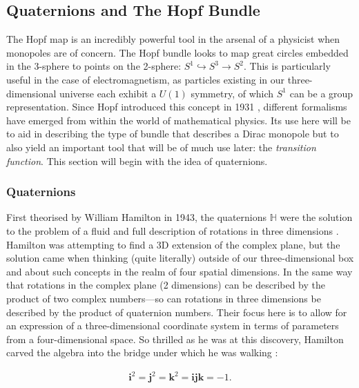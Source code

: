 \documentclass[fleqn, twocolumn, 10pt]{article}
\begin{document}

\subsection{Quaternions and The Hopf Bundle}

The Hopf map is an incredibly powerful tool in the arsenal of a physicist when monopoles are of concern. The Hopf bundle looks to map great circles embedded in the 3-sphere to points on the 2-sphere: $S^1 \hookrightarrow S^3 \to S^2$. This is particularly useful in the case of electromagnetism, as particles existing in our three-dimensional universe each exhibit a $U(1)$ symmetry, of which $S^1$ can be a group representation. Since Hopf introduced this concept in 1931 \cite{hopf1931map}, different formalisms have emerged from within the world of mathematical physics. Its use here will be to aid in describing the type of bundle that describes a Dirac monopole but to also yield an important tool that will be of much use later: the \textit{transition function}. This section will begin with the idea of quaternions. 

\subsubsection{Quaternions}

First theorised by William Hamilton in 1943, the quaternions $\mathbb{H}$ were the solution to the problem of a fluid and full description of rotations in three dimensions \cite{hamilton1848xi}. Hamilton was attempting to find a 3D extension of the complex plane, but the solution came when thinking (quite literally) outside of our three-dimensional box and about such concepts in the realm of four spatial dimensions. In the same way that rotations in the complex plane (2 dimensions) can be described by the product of two complex numbers---so can rotations in three dimensions be described by the product of quaternion numbers. Their focus here is to allow for an expression of a three-dimensional coordinate system in terms of parameters from a four-dimensional space. So thrilled as he was at this discovery, Hamilton carved the algebra into the bridge under which he was walking \cite{mignani1978quaternions, niles2011hopf}:

\begin{ceqn}
\begin{align}\tag{9}
\mathbf{i}^2 = \mathbf{j}^2 = \mathbf{k}^2 = \mathbf{ijk} = -1.
\end{align}
\end{ceqn}
\end{document}
